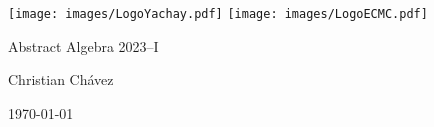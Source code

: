 \pagebreak

\begin{center}
    \texttt{[image: images/LogoYachay.pdf]} 
        \hfill
    \texttt{[image: images/LogoECMC.pdf]}
\end{center}

\pdfbookmark{\currfilebase}{\currfilebase}

\begin{center}
    {\LARGE
    Abstract Algebra 2023--I\\
    \vspace{0.25cm}
    \textbf{\thetitle{}}}
    
    Christian Chávez

    \today
\end{center}

